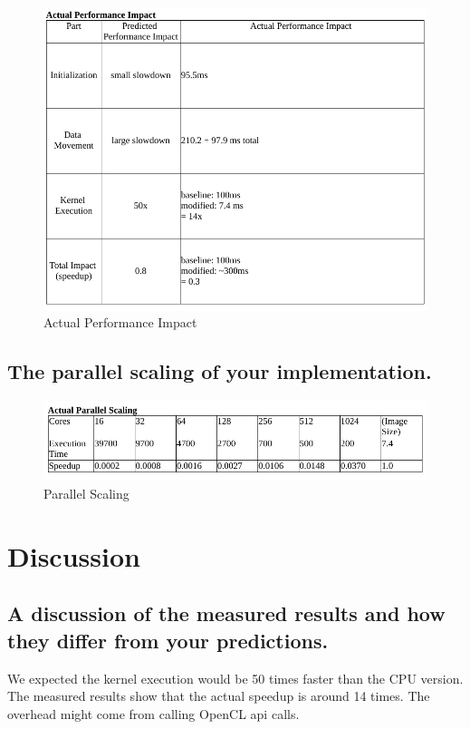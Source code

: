 \documentclass{article}
\begin{document}
\begin{figure}[h!t]
    \centering
    \includegraphics[width=1\textwidth]{actual.png}
    \caption{Actual Performance Impact}
    \label{fig:actual}
\end{figure}

\subsection{The parallel scaling of your implementation.}

\begin{figure}[h!t]
    \centering
    \includegraphics[width=1\textwidth]{parallel.png}
    \caption{Parallel Scaling}
    \label{fig:parallel}
\end{figure}

\section{Discussion}

\subsection{A discussion of the measured results and how they differ
  from your predictions.}
We expected the kernel execution would be 50 times faster than the CPU
version. The measured results show that the actual speedup is around
14 times. The overhead might come from calling OpenCL api calls.
\end{document}

